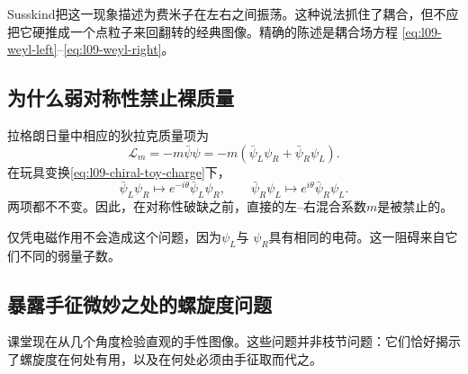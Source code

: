 Susskind把这一现象描述为费米子在左右之间振荡。这种说法抓住了耦合，但不应把它硬推成一个点粒子来回翻转的经典图像。精确的陈述是耦合场方程
\eqref{eq:l09-weyl-left}--\eqref{eq:l09-weyl-right}。

\begin{classroomqa}
\end{classroomqa}

\subsection{为什么弱对称性禁止裸质量}

拉格朗日量中相应的狄拉克质量项为
\begin{equation}
  \mathcal L_m
  =-m\bar\psi\psi
  =-m\left(\bar\psi_L\psi_R+\bar\psi_R\psi_L\right).
  \label{eq:l09-bare-dirac-mass}
\end{equation}
在玩具变换\eqref{eq:l09-chiral-toy-charge}下，
\begin{equation}
  \bar\psi_L\psi_R\longmapsto
  e^{-i\theta}\bar\psi_L\psi_R,
  \qquad
  \bar\psi_R\psi_L\longmapsto
  e^{i\theta}\bar\psi_R\psi_L.
\end{equation}
两项都不不变。因此，在对称性破缺之前，直接的左--右混合系数\(m\)是被禁止的。

仅凭电磁作用不会造成这个问题，因为\(\psi_L\)与
\(\psi_R\)具有相同的电荷。这一阻碍来自它们不同的弱量子数。

\subsection{暴露手征微妙之处的螺旋度问题}

课堂现在从几个角度检验直观的手性图像。这些问题并非枝节问题：它们恰好揭示了螺旋度在何处有用，以及在何处必须由手征取而代之。

\begin{classroomqa}
\end{classroomqa}

\begin{classroomqa}
\end{classroomqa}

